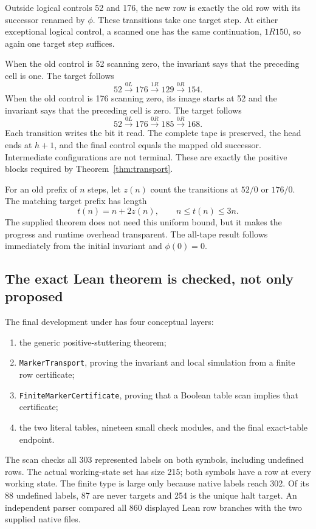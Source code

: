 \documentclass[11pt]{article}
\newcommand{\artifact}[1]{\path{#1}}
\begin{document}
Outside logical controls 52 and 176, the new row is exactly the old row with its successor renamed by $\phi$. These transitions take one target step. At either exceptional logical control, a scanned one has the same continuation, $1R150$, so again one target step suffices.

When the old control is 52 scanning zero, the invariant says that the preceding cell is one. The target follows
\[
52\xrightarrow{0L}176\xrightarrow{1R}129\xrightarrow{0R}154.
\]
When the old control is 176 scanning zero, its image starts at 52 and the invariant says that the preceding cell is zero. The target follows
\[
52\xrightarrow{0L}176\xrightarrow{0R}185\xrightarrow{0R}168.
\]
Each transition writes the bit it read. The complete tape is preserved, the head ends at $h+1$, and the final control equals the mapped old successor. Intermediate configurations are not terminal. These are exactly the positive blocks required by Theorem~\ref{thm:transport}.

For an old prefix of $n$ steps, let $z(n)$ count the transitions at $52/0$ or $176/0$. The matching target prefix has length
\[
t(n)=n+2z(n),\qquad n\leq t(n)\leq3n.
\]
The supplied theorem does not need this uniform bound, but it makes the progress and runtime overhead transparent. The all-tape result follows immediately from the initial invariant and $\phi(0)=0$.

\subsection{The exact Lean theorem is checked, not only proposed}

The final development under \artifact{cm215/lean/} has four conceptual layers:
\begin{enumerate}
\item the generic positive-stuttering theorem;
\item \texttt{MarkerTransport}, proving the invariant and local simulation from a finite row certificate;
\item \texttt{FiniteMarkerCertificate}, proving that a Boolean table scan implies that certificate;
\item the two literal tables, nineteen small check modules, and the final exact-table endpoint.
\end{enumerate}
The scan checks all 303 represented labels on both symbols, including undefined rows. The actual working-state set has size 215; both symbols have a row at every working state. The finite type is large only because native labels reach 302. Of its 88 undefined labels, 87 are never targets and 254 is the unique halt target. An independent parser compared all 860 displayed Lean row branches with the two supplied native files.
\end{document}
